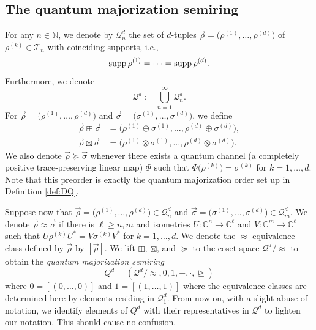 \documentclass[12pt,a4paper,reqno]{amsart}
\newcommand{\rgeq}{\trianglerighteq}
\theoremstyle{definition}
\newcommand{\mc}[1]{\mathcal{#1}}
\newcommand{\N}{\mathbb N}
\newcommand{\C}{\mathbb C}
\begin{document}
\subsection{The quantum majorization semiring}\label{subsec:quantumsemiring}

For any $n\in\N$, we denote by $\mc Q^d_n$ the set of $d$-tuples $\vec{\rho}=\big(\rho^{(1)},\ldots,\rho^{(d)}\big)$ of $\rho^{(k)}\in\mc T_n$ with coinciding supports, i.e.,
$$
{\rm supp}\,\rho^{(1)}=\cdots={\rm supp}\,\rho^{(d)}.
$$
Furthermore, we denote
$$
\mc Q^d:=\bigcup_{n=1}^\infty \mc Q^d_n.
$$
For $\vec{\rho}=\big(\rho^{(1)},\ldots,\rho^{(d)}\big)$ and $\vec{\sigma}=\big(\sigma^{(1)},\ldots,\sigma^{(d)}\big)$, we define
\begin{align*}
\vec{\rho}\boxplus\vec{\sigma}&=\big(\rho^{(1)}\oplus\sigma^{(1)},\ldots,\rho^{(d)}\oplus\sigma^{(d)}\big),\\
\vec{\rho}\boxtimes\vec{\sigma}&=\big(\rho^{(1)}\otimes\sigma^{(1)},\ldots,\rho^{(d)}\otimes\sigma^{(d)}\big).
\end{align*}
We also denote $\vec{\rho}\succeq\vec{\sigma}$ whenever there exists a quantum channel (a completely positive trace-preserving linear map) $\Phi$ such that $\Phi\big(\rho^{(k)}\big)=\sigma^{(k)}$ for $k=1,\ldots,d$. Note that this preorder is exactly the quantum majorization order set up in Definition \ref{def:DQ}.

Suppose now that $\vec{\rho}=\big(\rho^{(1)},\ldots,\rho^{(d)}\big)\in\mc Q^d_n$ and $\vec{\sigma}=\big(\sigma^{(1)},\ldots,\sigma^{(d)}\big)\in\mc Q^d_m$. We denote $\vec{\rho}\approx\vec{\sigma}$ if there is $\ell\geq n,m$ and isometries $U:\C^n\to\C^\ell$ and $V:\C^m\to\C^\ell$ such that $U\rho^{(k)}U^*=V\sigma^{(k)}V^*$ for $k=1,\ldots,d$. We denote the $\approx$-equivalence class defined by $\vec{\rho}$ by $[\vec{\rho}]$. We lift $\boxplus$, $\boxtimes$, and $\succeq$ to the coset space $\mc Q^d/\!\approx$ to obtain the {\it quantum majorization semiring}
$$
Q^d=(\mc Q^d/\!\approx,0,1,+,\cdot,\rgeq)
$$
where $0=[(0,\ldots,0)]$ and $1=[(1,\ldots,1)]$ where the equivalence classes are determined here by elements residing in $\mc Q^d_1$. From now on, with a slight abuse of notation, we identify elements of $Q^d$ with their representatives in $\mc Q^d$ to lighten our notation. This should cause no confusion.
\end{document}
